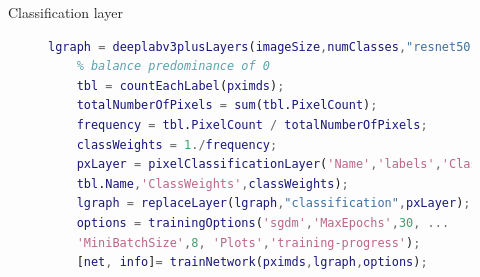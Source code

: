 \documentclass[aspectratio=169,xcolor=dvipsnames]{beamer}
\begin{document}
\begin{frame}[fragile]{Classification layer}
\begin{figure}
	\begin{minipage}{0.7\linewidth}
	\tiny{\begin{lstlisting}[language=Matlab,basicstyle=\tiny]
	lgraph = deeplabv3plusLayers(imageSize,numClasses,"resnet50"); 
	% balance predominance of 0
	tbl = countEachLabel(pximds);
	totalNumberOfPixels = sum(tbl.PixelCount);
	frequency = tbl.PixelCount / totalNumberOfPixels;
	classWeights = 1./frequency;
	pxLayer = pixelClassificationLayer('Name','labels','Classes',...
	tbl.Name,'ClassWeights',classWeights);
	lgraph = replaceLayer(lgraph,"classification",pxLayer);
	options = trainingOptions('sgdm','MaxEpochs',30, ...  
	'MiniBatchSize',8, 'Plots','training-progress');
	[net, info]= trainNetwork(pximds,lgraph,options);
\end{lstlisting}}
\centering
\vspace{5 mm}
\begin{minipage}{0.6\linewidth}
		\tiny{\def\svgwidth{\linewidth}
		}
\end{minipage}\hfill
\begin{minipage}{0.4\linewidth}
	\centering

\end{minipage}
\end{minipage}
\end{figure}
\end{frame}
\end{document}
